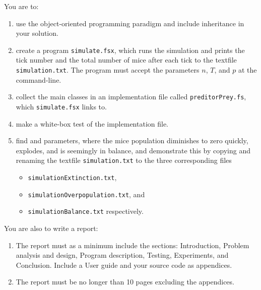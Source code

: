 You are to:
\begin{enumerate}
\item use the object-oriented programming paradigm and include inheritance in your solution.
\item create a program \lstinline[language=console]{simulate.fsx}, which runs the simulation and prints the tick number and the total number of mice after each tick to the textfile \lstinline[language=console]{simulation.txt}. The program must accept the parameters $n$, $T$, and $p$ at the command-line. 
\item collect the main classes in an implementation file called \lstinline[language=console]{preditorPrey.fs}, which \lstinline[language=console]{simulate.fsx} links to.
\item make a white-box test of the implementation file.
\item find and parameters, where the mice population diminishes to zero quickly, explodes, and is seemingly in balance, and demonstrate this by copying and renaming the textfile \lstinline[language=console]{simulation.txt} to the three corresponding files
  \begin{itemize}
  \item \lstinline[language=console]{simulationExtinction.txt},
  \item \lstinline[language=console]{simulationOverpopulation.txt}, and
  \item \lstinline[language=console]{simulationBalance.txt} respectively.
  \end{itemize}
\end{enumerate}
You are also to write a report:
\begin{enumerate}[resume]
\item The report must as a minimum include
  the sections: Introduction, Problem analysis and design, Program
  description, Testing, Experiments, and Conclusion. Include a User
  guide and your source code as appendices.
\item The report must be
  no longer than 10 pages excluding the appendices.
\end{enumerate}
